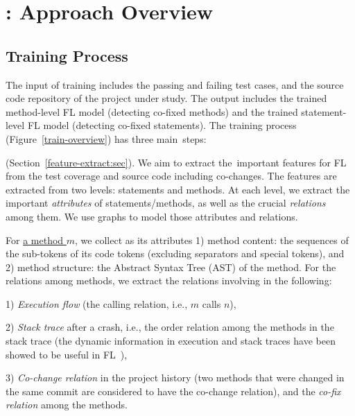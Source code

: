\section{{\tool}: Approach Overview}
\label{overview:sec}





\subsection{Training Process}



The input of training includes the passing and failing test cases,
and the source code repository of the project under study. The
output includes the trained method-level FL model (detecting co-fixed
methods) and the trained statement-level FL model (detecting co-fixed
statements). The training process (Figure~\ref{train-overview}) has
three main~steps:

\vspace{3pt}
(Section~\ref{feature-extract:sec}). We aim to extract the~important
features for FL from the test coverage and source code including
co-changes. The features are extracted from two levels: statements and
methods. At each level, we extract the important {\em attributes} of
statements/methods, as well as the crucial {\em relations} among
them. We use graphs to model those attributes and relations.

For \underline{a method $m$}, we collect as its attributes 1) method
content: the sequences of the sub-tokens of its code tokens (excluding
separators and special tokens), and 2) method structure: the Abstract
Syntax Tree (AST) of the method. For the relations among methods, we
extract the relations involving in the following:

1) {\em Execution flow} (the calling relation, i.e., $m$ calls $n$),

2) {\em Stack trace} after a crash, i.e., the order relation among the
methods in the stack trace (the dynamic information in execution
and stack traces have been showed to be useful in
FL~\cite{icse21-fl,DeepFL}),

3) {\em Co-change relation} in the project history (two methods that
were changed in the same commit are considered to have the co-change
relation), and the {\em co-fix relation} among the methods.

